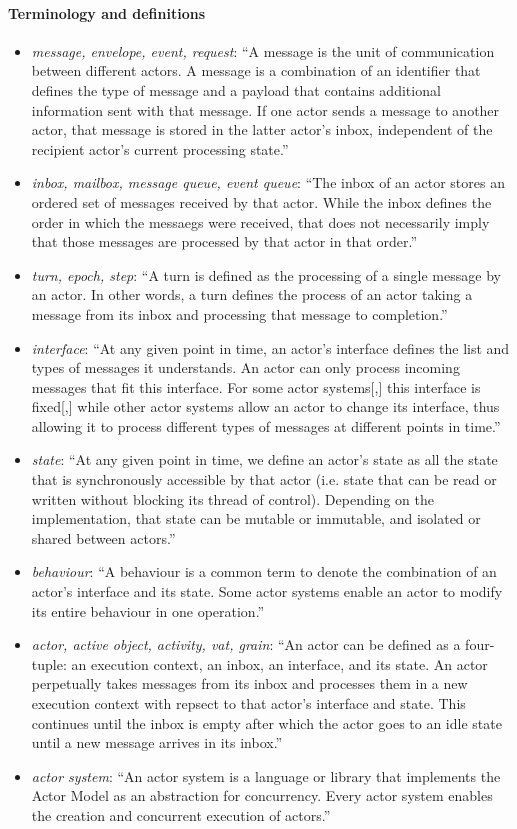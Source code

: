 \paragraph{Terminology and definitions}
\begin{itemize}
\item \emph{message, envelope, event, request}: ``A message is the unit of communication between different actors. A message is a combination of an identifier that defines the type of message and a payload that contains additional information sent with that message. If one actor sends a message to another actor, that message is stored in the latter actor's inbox, independent of the recipient actor's current processing state.''
\item \emph{inbox, mailbox, message queue, event queue}: ``The inbox of an actor stores an ordered set of messages received by that actor. While the inbox defines the order in which the messaegs were received, that does not necessarily imply that those messages are processed by that actor in that order.''
\item \emph{turn, epoch, step}: ``A turn is defined as the processing of a single message by an actor. In other words, a turn defines the process of an actor taking a message from its inbox and processing that message to completion.''
\item \emph{interface}: ``At any given point in time, an actor's interface defines the list and types of messages it understands. An actor can only process incoming messages that fit this interface. For some actor systems[,] this interface is fixed[,] while other actor systems allow an actor to change its interface, thus allowing it to process different types of messages at different points in time.''
\item \emph{state}: ``At any given point in time, we define an actor's state as all the state that is synchronously accessible by that actor (i.e. state that can be read or written without blocking its thread of control). Depending on the implementation, that state can be mutable or immutable, and isolated or shared between actors.''
\item \emph{behaviour}: ``A behaviour is a common term to denote the combination of an actor's interface and its state. Some actor systems enable an actor to modify its entire behaviour in one operation.''
\item \emph{actor, active object, activity, vat, grain}: ``An actor can be defined as a four-tuple: an execution context, an inbox, an interface, and its state. An actor perpetually takes messages from its inbox and processes them in a new execution context with repsect to that actor's interface and state. This continues until the inbox is empty after which the actor goes to an idle state until a new message arrives in its inbox.''
\item \emph{actor system}: ``An actor system is a language or library that implements the Actor Model as an abstraction for concurrency. Every actor system enables the creation and concurrent execution of actors.''
\end{itemize}

